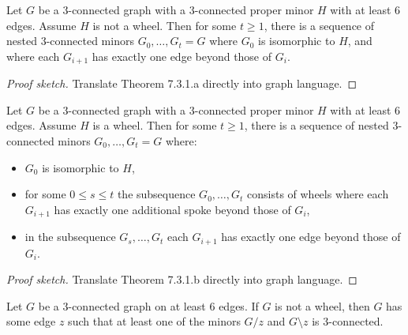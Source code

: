 \begin{corollary}[7.3.2.a]
  \label{cor:7.3.2.a}
  Let $G$ be a $3$-connected graph with a $3$-connected proper minor $H$ with at least $6$ edges. Assume $H$ is not a wheel. Then for some $t \geq 1$, there is a sequence of nested $3$-connected minors $G_{0}, \dots, G_{t} = G$ where $G_{0}$ is isomorphic to $H$, and where each $G_{i + 1}$ has exactly one edge beyond those of $G_{i}$.
\end{corollary}

\begin{proof}[Proof sketch]
  Translate Theorem 7.3.1.a directly into graph language.
\end{proof}

\begin{corollary}[7.3.2.b]
  \label{cor:7.3.2.b}
  Let $G$ be a $3$-connected graph with a $3$-connected proper minor $H$ with at least $6$ edges. Assume $H$ is a wheel. Then for some $t \geq 1$, there is a sequence of nested $3$-connected minors $G_{0}, \dots, G_{t} = G$ where:
  \begin{itemize}
    \item $G_{0}$ is isomorphic to $H$,
    \item for some $0 \leq s \leq t$ the subsequence $G_{0}, \dots, G_{t}$ consists of wheels where each $G_{i + 1}$ has exactly one additional spoke beyond those of $G_{i}$,
    \item in the subsequence $G_{s}, \dots, G_{t}$ each $G_{i + 1}$ has exactly one edge beyond those of $G_{i}$.
  \end{itemize}
\end{corollary}

\begin{proof}[Proof sketch]
  Translate Theorem 7.3.1.b directly into graph language.
\end{proof}

\begin{theorem}
  \label{thm:7.3.3}
  Let $G$ be a $3$-connected graph on at least $6$ edges. If $G$ is not a wheel, then $G$ has some edge $z$ such that at least one of the minors $G / z$ and $G \setminus z$ is $3$-connected.
\end{theorem}

